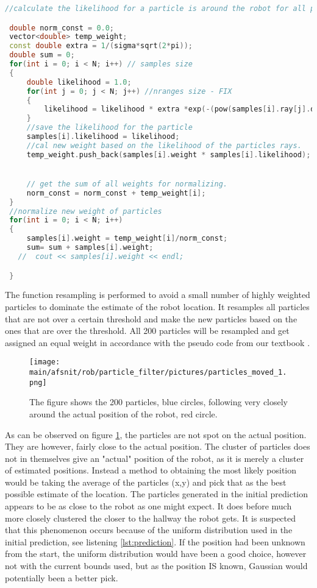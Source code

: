 \documentclass[../../../Main.tex]{subfiles}
\begin{document}
\begin{lstlisting}[language=C++, caption= Code of likelihood calculation and normliazing of aprticles weight, label={lst:label}]
//calculate the likelihood for a particle is around the robot for all particles.

 double norm_const = 0.0;
 vector<double> temp_weight;
 const double extra = 1/(sigma*sqrt(2*pi));
 double sum = 0;
 for(int i = 0; i < N; i++) // samples size
 {
     double likelihood = 1.0;
     for(int j = 0; j < N; j++) //nranges size - FIX
     {
         likelihood = likelihood * extra *exp(-(pow(samples[i].ray[j].distance-robot_rays[i].distance,2))/(2*pow(sigma,2)));
     }
     //save the likelihood for the particle
     samples[i].likelihood = likelihood;
     //cal new weight based on the likelihood of the particles rays.
     temp_weight.push_back(samples[i].weight * samples[i].likelihood);


     // get the sum of all weights for normalizing.
     norm_const = norm_const + temp_weight[i];
 }
 //normalize new weight of particles
 for(int i = 0; i < N; i++)
 {
     samples[i].weight = temp_weight[i]/norm_const;
     sum= sum + samples[i].weight;
   //  cout << samples[i].weight << endl;

 }
\end{lstlisting}
The function resampling is performed to avoid a small number of highly weighted particles to dominate the estimate of the robot location. It resamples all particles that are not over a certain threshold and make the new particles based on the ones that are over the threshold. All 200 particles will be resampled and get assigned an equal weight in accordance with the pseudo code from our textbook \cite{robbook}.

\begin{figure}[H]
  \centering
  \texttt{[image: \\main/afsnit/rob/particle\_filter/pictures/particles\_moved\_1.png]}
  \caption{The figure shows the 200 particles, blue circles, following very closely around the actual position of the robot, red circle.}
  \label{fig:particle_filter_1}
\end{figure}

As can be observed on figure \ref{fig:particle_filter_1}, the particles are not spot on the actual position. They are however, fairly close to the actual position. The cluster of particles does not in themselves give an "actual" position of the robot, as it is merely a cluster of estimated positions.
Instead a method to obtaining the most likely position would be taking the average of the particles (x,y) and pick that as the best possible estimate of the location.
The particles generated in the initial prediction appears to be as close to the robot as one might expect.
It does before much more closely clustered the closer to the hallway the robot gets.
It is suspected that this phenomenon occurs because of the uniform distribution used in the initial prediction, see listening \ref{lst:prediction}.
If the position had been unknown from the start, the uniform distribution would have been a good choice, however not with the current bounds used, but as the position IS known, Gaussian would potentially been a better pick.  \\
\end{document}

